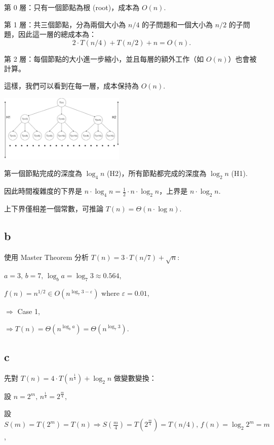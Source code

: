 \documentclass[8pt, fleqn]{report}
\begin{document}
第 0 層：只有一個節點為根 (root)，成本為 \(O(n)\).

第 1 層：共三個節點，分為兩個大小為 \(n/4\) 的子問題和一個大小為 \(n/2\) 的子問題，因此這一層的總成本為：
\[
    2 \cdot T(n/4) + T(n/2) + n = O(n).
\]

第 2 層：每個節點的大小進一步縮小，並且每層的額外工作（如 \(O(n)\)）也會被計算。

這樣，我們可以看到在每一層，成本保持為 \(O(n)\).

\begin{center}
    \includegraphics[width=60mm]{unbalance_case.png}
\end{center}

第一個節點完成的深度為 \(\log_4{n}\) (H2)，所有節點都完成的深度為 \(\log_2{n}\) (H1).

因此時間複雜度的下界是 \(n \cdot \log_4{n} = \frac{1}{2} \cdot n \cdot \log_2{n}\)，上界是 \(n \cdot \log_2{n}\).

上下界僅相差一個常數，可推論 \(T(n) = \Theta(n \cdot \log{n})\).

\subsection*{b}
使用 Master Theorem 分析 \(T(n) = 3 \cdot T(n/7) + \sqrt{n}\):

\(a = 3, \, b = 7, \, \log_b{a} = \log_7{3} \approx 0.564\),

\(f(n) = n^{1/2} \in O(n^{\log_7{3} - \varepsilon})\) where \(\varepsilon = 0.01\),

\(\Rightarrow\) Case 1,

\(\Rightarrow T(n) = \Theta(n^{\log_b{a}}) = \Theta(n^{\log_7{3}})\).

\subsection*{c}
先對 \(T(n) = 4 \cdot T(n^{\frac{1}{4}}) + \log_2{n}\) 做變數變換：

設 \(n = 2^m, \, n^{\frac{1}{4}} = 2^{\frac{m}{4}}\),

設 \(S(m) = T(2^m) = T(n) \Rightarrow S(\frac{m}{4}) = T(2^{\frac{m}{4}}) = T(n/4), \, f(n) = \log_2{2^m} = m\),
\end{document}
